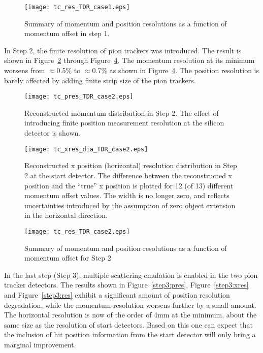 \documentclass[20]{article}
\begin{document}
\begin{figure}[tbp]
  \texttt{[image: tc\_res\_TDR\_case1.eps]}
  \caption{Summary of momentum and position resolutions as a function
    of momentum offset in step 1.}
  \label {step1:res}
\end{figure}

In Step 2, the finite resolution of pion trackers was introduced. The
result is shown in Figure~\ref{step2:pres} through
Figure~\ref{step2:res}. The momentum resolution at its minimum worsens
from $\approx$0.5\% to $\approx$0.7\% as shown in
Figure~\ref{step2:res}. The position resolution is barely affected by
adding finite strip size of the pion trackers.


\begin{figure}[tbp]
  \texttt{[image: tc\_pres\_TDR\_case2.eps]}
  \caption{Reconstructed momentum distribution in Step 2. The effect
    of introducing finite position measurement resolution at the
    silicon detector is shown. }
  \label {step2:pres}
\end{figure}

\begin{figure}[tbp]
  \texttt{[image: tc\_xres\_dia\_TDR\_case2.eps]}
  \caption{Reconstructed x position (horizontal) resolution
    distribution in Step 2 at the start detector. The difference
    between the reconstructed x position and the ``true'' x position
    is plotted for 12 (of 13) different momentum offset values. The
    width is no longer zero, and reflects uncertainties introduced by
    the assumption of zero object extension in the horizontal
    direction.}
  \label {step2:xres}
\end{figure}


\begin{figure}[tbp]
  \texttt{[image: tc\_res\_TDR\_case2.eps]}
  \caption{Summary of momentum and position resolutions as a function
    of momentum offset for Step 2}
  \label {step2:res}
\end{figure}

In the last step (Step 3), multiple scattering emulation is enabled in
the two pion tracker detectors. The results shown in
Figure~\ref{step3:pres}, Figure~\ref{step3:xres} and
Figure~\ref{step3:res} exhibit a significant amount of position
resolution degradation, while the momentum resolution worsens further
by a small amount. The horizontal resolution is now of the order of
4mm at the minimum, about the same size as the resolution of start
detectors. Based on this one can expect that the inclusion of hit
position information from the start detector will only bring a
marginal improvement. 
\end{document}
